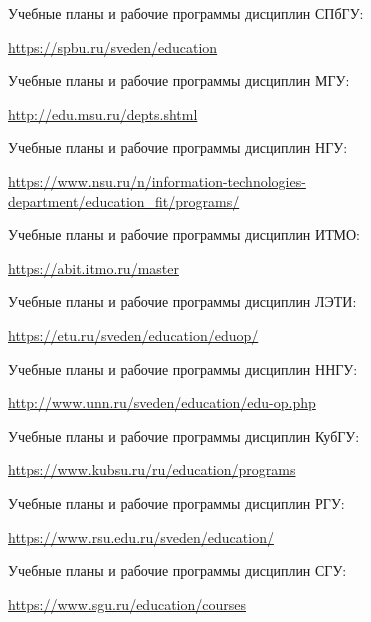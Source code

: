 \documentclass{math-mech-sci}
\begin{document}
\begin{thebibliography}{9}

 Учебные планы и рабочие программы дисциплин СПбГУ: 

  \href{https://spbu.ru/sveden/education}{https://spbu.ru/sveden/education}

 Учебные планы и рабочие программы дисциплин МГУ: 

  \href{http://edu.msu.ru/depts.shtml}{http://edu.msu.ru/depts.shtml}
  
 Учебные планы и рабочие программы дисциплин НГУ: 

 \href{https://www.nsu.ru/n/information-technologies-department/education_fit/programs/}{https://www.nsu.ru/n/information-technologies-department/education\_fit/programs/}

 Учебные планы и рабочие программы дисциплин ИТМО: 

 \href{https://abit.itmo.ru/master}{https://abit.itmo.ru/master}

 Учебные планы и рабочие программы дисциплин ЛЭТИ: 

  \href{https://etu.ru/sveden/education/eduop/}{https://etu.ru/sveden/education/eduop/}

 Учебные планы и рабочие программы дисциплин ННГУ: 

  \href{http://www.unn.ru/sveden/education/edu-op.php}{http://www.unn.ru/sveden/education/edu-op.php}
  

 Учебные планы и рабочие программы дисциплин КубГУ: 

  \href{https://www.kubsu.ru/ru/education/programs}{https://www.kubsu.ru/ru/education/programs}
  
   Учебные планы и рабочие программы дисциплин РГУ: 

  \href{https://www.rsu.edu.ru/sveden/education/}{https://www.rsu.edu.ru/sveden/education/}
  
   Учебные планы и рабочие программы дисциплин СГУ: 

  \href{https://www.sgu.ru/education/courses}{https://www.sgu.ru/education/courses}
  
  
 \end{thebibliography}
\end{document}
